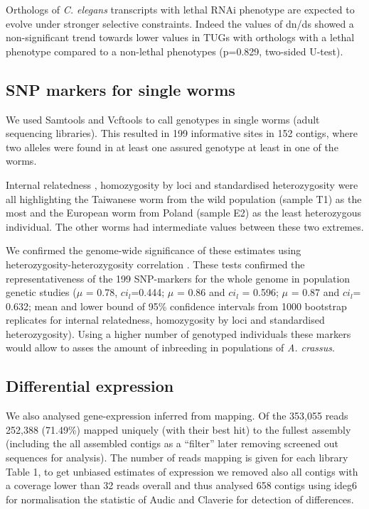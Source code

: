 \documentclass[10pt]{bmc_article}
\newenvironment{bmcformat}{\begin{raggedright}\baselineskip20pt\sloppy\setboolean{publ}{false}}{\end{raggedright}\baselineskip20pt\sloppy}
\begin{document}
\begin{bmcformat}
Orthologs of \textit{C. elegans} transcripts with lethal
RNAi phenotype are expected to evolve under stronger selective
constraints. Indeed the values of dn/ds showed a non-significant trend
towards lower values in TUGs with orthologs with a lethal phenotype
compared to a non-lethal phenotypes
(p=0.829, two-sided U-test).

\subsection*{SNP markers for single worms}

We used Samtools \cite{journals/bioinformatics/LiHWFRHMAD09} and
Vcftools \cite{pmid21653522} to call genotypes in single worms (adult
sequencing libraries). This resulted in 199
informative sites in 152 contigs, where two
alleles were found in at least one assured genotype at least in one of
the worms.

Internal relatedness \cite{pmid11571049}, homozygosity by loci
\cite{pmid17107491} and standardised heterozygosity \cite{coltman81j}
were all highlighting the Taiwanese worm from the wild population
(sample T1) as the most and the European worm from Poland (sample E2)
as the least heterozygous individual. The other worms had intermediate
values between these two extremes.

We confirmed the genome-wide significance of these estimates using
heterozygosity-heterozygosity correlation \cite{pmid21565077}. These
tests confirmed the representativeness of the 199
SNP-markers for the whole genome in population genetic studies ($\mu$
= 0.78, $ci_l$=0.444; $\mu$ = 0.86 and $ci_l$ = 0.596; $\mu$ = 0.87
and $ci_l$= 0.632; mean and lower bound of 95\% confidence intervals
from 1000 bootstrap replicates for internal relatedness, homozygosity
by loci and standardised heterozygosity). Using a higher number of
genotyped individuals these markers would allow to asses the amount of
inbreeding in populations of \textit{A. crassus}.

 \subsection*{Differential expression}
                






We also analysed gene-expression inferred from mapping. Of the
353,055 reads 252,388
(71.49\%) mapped uniquely
(with their best hit) to the fullest assembly (including the all
assembled contigs as a ``filter'' later removing screened out
sequences for analysis). The number of reads mapping is given for each
library Table 1, to get unbiased estimates of expression we removed
also all contigs with a coverage lower than 32 reads overall and thus
analysed 658 contigs using ideg6
\cite{pmid12429865} for normalisation the statistic of Audic and
Claverie \cite{pmid9331369} for detection of differences.


\end{bmcformat}
\end{document}
